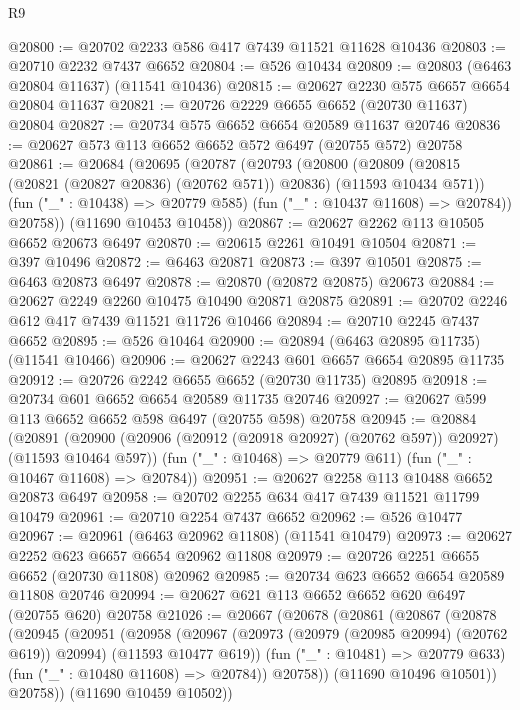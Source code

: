 \begin{lexlean}{R9}
\begin{coremodule}
{{{{{{{{{{{{{{{{{{{{{{{{{{{{{{{{{{{{{{{{{{{{{{{{{{{{{{{{{{{{{{{{{{{{{{{{{{{{{{{{{{{{@20800 := @20702 @2233 @586 @417 @7439 @11521 @11628 @10436
@20803 := @20710 @2232 @7437 @6652
@20804 := @526 @10434
@20809 := @20803 (@6463 @20804 @11637) (@11541 @10436)
@20815 := @20627 @2230 @575 @6657 @6654 @20804 @11637
@20821 := @20726 @2229 @6655 @6652 (@20730 @11637) @20804
@20827 := @20734 @575 @6652 @6654 @20589 @11637 @20746
@20836 := @20627 @573 @113 @6652 @6652 @572 @6497 (@20755 @572) @20758
@20861 := @20684
    (@20695
      (@20787
        (@20793
          (@20800
            (@20809 (@20815 (@20821 (@20827 @20836) (@20762 @571)) @20836) (@11593 @10434 @571))
            (fun ("_" : @10438) => @20779 @585)
            (fun ("_" : @10437 @11608) => @20784))
          @20758))
      (@11690 @10453 @10458))
@20867 := @20627 @2262 @113 @10505 @6652 @20673 @6497
@20870 := @20615 @2261 @10491 @10504
@20871 := @397 @10496
@20872 := @6463 @20871
@20873 := @397 @10501
@20875 := @6463 @20873 @6497
@20878 := @20870 (@20872 @20875) @20673
@20884 := @20627 @2249 @2260 @10475 @10490 @20871 @20875
@20891 := @20702 @2246 @612 @417 @7439 @11521 @11726 @10466
@20894 := @20710 @2245 @7437 @6652
@20895 := @526 @10464
@20900 := @20894 (@6463 @20895 @11735) (@11541 @10466)
@20906 := @20627 @2243 @601 @6657 @6654 @20895 @11735
@20912 := @20726 @2242 @6655 @6652 (@20730 @11735) @20895
@20918 := @20734 @601 @6652 @6654 @20589 @11735 @20746
@20927 := @20627 @599 @113 @6652 @6652 @598 @6497 (@20755 @598) @20758
@20945 := @20884
    (@20891
      (@20900 (@20906 (@20912 (@20918 @20927) (@20762 @597)) @20927) (@11593 @10464 @597))
      (fun ("_" : @10468) => @20779 @611)
      (fun ("_" : @10467 @11608) => @20784))
@20951 := @20627 @2258 @113 @10488 @6652 @20873 @6497
@20958 := @20702 @2255 @634 @417 @7439 @11521 @11799 @10479
@20961 := @20710 @2254 @7437 @6652
@20962 := @526 @10477
@20967 := @20961 (@6463 @20962 @11808) (@11541 @10479)
@20973 := @20627 @2252 @623 @6657 @6654 @20962 @11808
@20979 := @20726 @2251 @6655 @6652 (@20730 @11808) @20962
@20985 := @20734 @623 @6652 @6654 @20589 @11808 @20746
@20994 := @20627 @621 @113 @6652 @6652 @620 @6497 (@20755 @620) @20758
@21026 := @20667
    (@20678
      (@20861
        (@20867
          (@20878
            (@20945
              (@20951
                (@20958
                  (@20967
                    (@20973 (@20979 (@20985 @20994) (@20762 @619)) @20994)
                    (@11593 @10477 @619))
                  (fun ("_" : @10481) => @20779 @633)
                  (fun ("_" : @10480 @11608) => @20784))
                @20758))
            (@11690 @10496 @10501))
          @20758))
      (@11690 @10459 @10502))
}}}}}}}}}}}}}}}}}}}}}}}}}}}}}}}}}}}}}}}}}}}}}}}}}}}}}}}}}}}}}}}}}}}}}}}}}}}}}}}}}}}}
\end{coremodule}
\end{lexlean}
